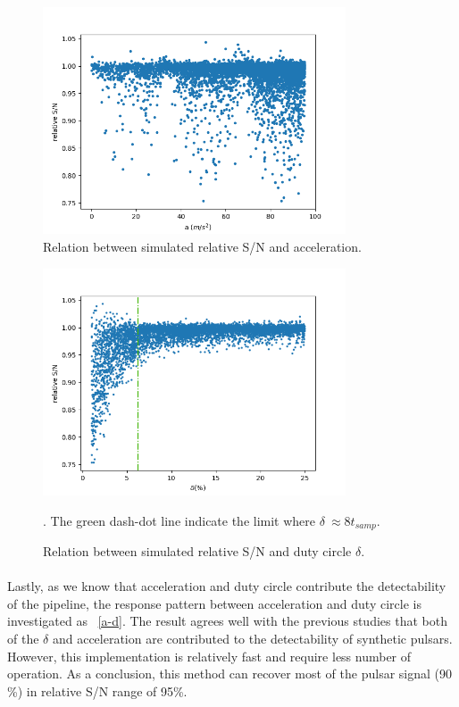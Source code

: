 \documentclass[thesis_msc.tex]{subfiles}
\begin{document}
\begin{figure}[h!]
\centering
\includegraphics[width=0.80\textwidth]{figures/A}
\caption{Relation between simulated relative S/N and acceleration.  }\label{a_twice}
\end{figure}

\begin{figure}[h!]
\centering
\includegraphics[width=0.80\textwidth]{figures/duty_twice}
\caption{Relation between simulated relative S/N and duty circle $\delta$.}\label{duty_twice}. The green dash-dot line indicate the limit where $\delta ~\approx 8t_{samp}$.
\end{figure}

\paragraph{} Lastly, as we know that acceleration and duty circle contribute the detectability of the pipeline, the response pattern between acceleration and duty circle is investigated as ~\ref{a-d}. The result agrees well with the previous studies that both of the $\delta$ and acceleration are contributed to the detectability of synthetic pulsars. However, this implementation is relatively fast and require less number of operation. As a conclusion, this method can recover most of the pulsar signal (90 \%) in relative S/N range of 95\%. 
                     
\end{document}

